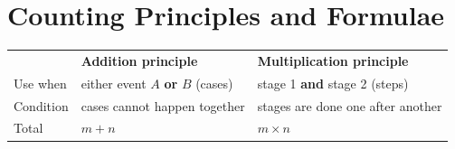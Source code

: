 \clearpage
{}
\section{Counting Principles and Formulae}
\begin{center}\ba\small
\begin{tabular}{|M{3.4cm}|M{5.6cm}|M{6.2cm}|}\hline
 & \textbf{Addition principle} & \textbf{Multiplication principle}\\\Xhline{2pt}
Use when & either event $A$ \textbf{or} $B$ (cases) & stage 1 \textbf{and} stage 2 (steps)\\\hline
Condition & cases cannot happen together & stages are done one after another\\\hline
Total & $m+n$ & $m\times n$\\\hline
\end{tabular}\end{center}
